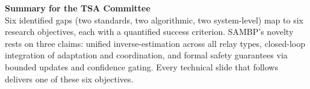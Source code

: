 \documentclass[12pt,a4paper]{article}
\begin{document}
\vspace{1em}
\begin{tcolorbox}[colback=iitmnavy!5,colframe=iitmnavy,arc=3pt,boxrule=1pt]
\small\centering
\textbf{Summary for the TSA Committee}\\[3pt]
Six identified gaps (two standards, two algorithmic, two system-level) map to six
research objectives, each with a quantified success criterion.  SAMBP's novelty
rests on three claims: unified inverse-estimation across all relay types, closed-loop
integration of adaptation and coordination, and formal safety guarantees via bounded
updates and confidence gating.  Every technical slide that follows delivers one of
these six objectives.
\end{tcolorbox}
\end{document}
